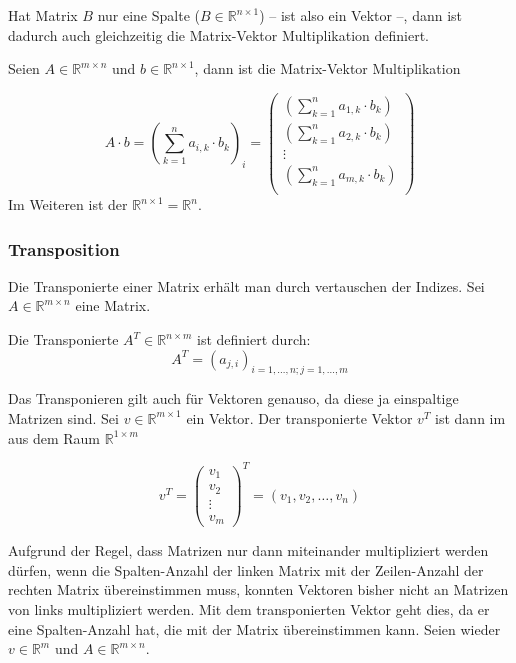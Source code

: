 \begin{fancyquotes}
Hat Matrix $B$ nur eine Spalte ($B\in \mathbb{R}^{n\times 1}$) -- ist also ein Vektor --, dann ist dadurch auch gleichzeitig die Matrix-Vektor Multiplikation definiert. 
\end{fancyquotes}

Seien $A\in \mathbb{R}^{m\times n}$ und $b\in \mathbb{R}^{n\times 1}$, dann ist die Matrix-Vektor Multiplikation

\begin{equation*}
A \cdot b = \left( \sum_{k=1}^{n} a_{i,k} \cdot b_{k} \right)_{i} = \begin{pmatrix}
\left( \sum_{k=1}^{n} a_{1,k} \cdot b_{k} \right) \\
\left( \sum_{k=1}^{n} a_{2,k} \cdot b_{k} \right) \\
\vdots \\
\left( \sum_{k=1}^{n} a_{m,k} \cdot b_{k} \right) \\
\end{pmatrix}
\end{equation*}
Im Weiteren ist der $\mathbb{R}^{n\times 1} = \mathbb{R}^n$.


\subsubsection{Transposition}

Die Transponierte einer Matrix erhält man durch vertauschen der Indizes. Sei $A \in \mathbb{R}^{m\times n} $ eine Matrix. 

\begin{definition}
Die Transponierte $A^T \in \mathbb{R}^{n\times m}$ ist definiert durch:
\[
	A^T = (a_{j,i})_{i=1,\dots, n; j=1,\dots, m}
\]
\end{definition}
Das Transponieren gilt auch für Vektoren genauso, da diese ja einspaltige Matrizen sind. Sei $v\in \mathbb{R}^{m\times 1}$ ein Vektor. Der transponierte Vektor $v^T$ ist dann im aus dem Raum $\mathbb{R}^{1\times m}$

\[
v^T = \begin{pmatrix}
v_1\\
v_2\\
\vdots \\
v_m
\end{pmatrix}^T = (v_1, v_2, \dots , v_n)
\]

Aufgrund der Regel, dass Matrizen nur dann miteinander multipliziert werden dürfen, wenn die Spalten-Anzahl der linken Matrix mit der Zeilen-Anzahl der rechten Matrix übereinstimmen muss, konnten Vektoren bisher nicht an Matrizen von links multipliziert werden. Mit dem transponierten Vektor geht dies, da er eine Spalten-Anzahl hat, die mit der Matrix übereinstimmen kann. Seien wieder $v\in \mathbb{R}^m$ und $A\in \mathbb{R}^{m\times n}$.

